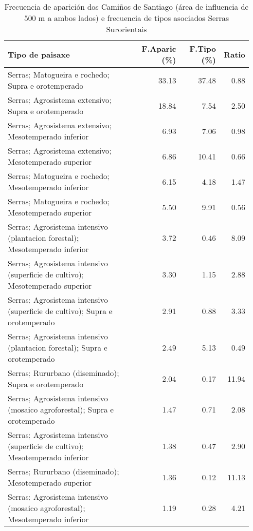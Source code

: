 \begin{table}[p]
\centering
\caption{Frecuencia de aparición dos Camiños de Santiago (área de influencia de 500 m a ambos lados) e frecuencia de tipos asociados Serras Surorientais} 
\label{vcamino9}
\begin{tabular}{lrrr}
  \hline
Tipo de paisaxe & F.Aparic (\%) & F.Tipo (\%) & Ratio \\ 
  \hline
Serras; Matogueira e rochedo; Supra e orotemperado & 33.13 & 37.48 & 0.88 \\ 
  Serras; Agrosistema extensivo; Supra e orotemperado & 18.84 & 7.54 & 2.50 \\ 
  Serras; Agrosistema extensivo; Mesotemperado inferior & 6.93 & 7.06 & 0.98 \\ 
  Serras; Agrosistema extensivo; Mesotemperado superior & 6.86 & 10.41 & 0.66 \\ 
  Serras; Matogueira e rochedo; Mesotemperado inferior & 6.15 & 4.18 & 1.47 \\ 
  Serras; Matogueira e rochedo; Mesotemperado superior & 5.50 & 9.91 & 0.56 \\ 
  Serras; Agrosistema intensivo (plantacion forestal); Mesotemperado inferior & 3.72 & 0.46 & 8.09 \\ 
  Serras; Agrosistema intensivo (superficie de cultivo); Mesotemperado superior & 3.30 & 1.15 & 2.88 \\ 
  Serras; Agrosistema intensivo (superficie de cultivo); Supra e orotemperado & 2.91 & 0.88 & 3.33 \\ 
  Serras; Agrosistema intensivo (plantacion forestal); Supra e orotemperado & 2.49 & 5.13 & 0.49 \\ 
  Serras; Rururbano (diseminado); Supra e orotemperado & 2.04 & 0.17 & 11.94 \\ 
  Serras; Agrosistema intensivo (mosaico agroforestal); Supra e orotemperado & 1.47 & 0.71 & 2.08 \\ 
  Serras; Agrosistema intensivo (superficie de cultivo); Mesotemperado inferior & 1.38 & 0.47 & 2.90 \\ 
  Serras; Rururbano (diseminado); Mesotemperado superior & 1.36 & 0.12 & 11.13 \\ 
  Serras; Agrosistema intensivo (mosaico agroforestal); Mesotemperado inferior & 1.19 & 0.28 & 4.21 \\ 
   \hline
\end{tabular}
\end{table}
